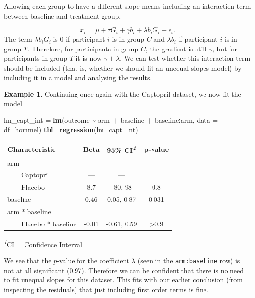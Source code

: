 \documentclass[
  openany]{book}
\newenvironment{Shaded}{\begin{snugshade}}{\end{snugshade}}
\newcommand{\AttributeTok}[1]{\textcolor[rgb]{0.13,0.29,0.53}{#1}}
\newcommand{\FunctionTok}[1]{\textcolor[rgb]{0.13,0.29,0.53}{\textbf{#1}}}
\newcommand{\NormalTok}[1]{#1}
\newcommand{\OtherTok}[1]{\textcolor[rgb]{0.56,0.35,0.01}{#1}}
\newcommand{\SpecialCharTok}[1]{\textcolor[rgb]{0.81,0.36,0.00}{\textbf{#1}}}
\theoremstyle{definition}
\theoremstyle{definition}
\newtheorem{example}{Example}[chapter]
\theoremstyle{definition}
\theoremstyle{definition}
\theoremstyle{remark}
\begin{document}
Allowing each group to have a different slope means including an interaction term between baseline and treatment group,

\[ x_i = \mu + \tau G_i+ \gamma b_i + \lambda b_i G_i + \epsilon_i . \]
The term \(\lambda b_i G_i\) is 0 if participant \(i\) is in group \(C\) and \(\lambda b_i\) if participant \(i\) is in group \(T\). Therefore, for participants in group \(C\), the gradient is still \(\gamma\), but for participants in group \(T\) it is now \(\gamma + \lambda\). We can test whether this interaction term should be included (that is, whether we should fit an unequal slopes model) by including it in a model and analysing the results.

\begin{example}
Continuing once again with the Captopril dataset, we now fit the model

\begin{Shaded}
\begin{Highlighting}[]
\NormalTok{lm\_capt\_int }\OtherTok{=} \FunctionTok{lm}\NormalTok{(outcome }\SpecialCharTok{\textasciitilde{}}\NormalTok{ arm }\SpecialCharTok{+}\NormalTok{ baseline }\SpecialCharTok{+}\NormalTok{ baseline}\SpecialCharTok{:}\NormalTok{arm, }\AttributeTok{data =}\NormalTok{ df\_hommel)}
\FunctionTok{tbl\_regression}\NormalTok{(lm\_capt\_int)}
\end{Highlighting}
\end{Shaded}

\begin{table}[!t]
\fontsize{12.0pt}{14.4pt}\selectfont
\begin{tabular*}{\linewidth}{@{\extracolsep{\fill}}lccc}
\toprule
\textbf{Characteristic} & \textbf{Beta} & \textbf{95\% CI}\textsuperscript{\textit{1}} & \textbf{p-value} \\ 
\midrule\addlinespace[2.5pt]
arm &  &  &  \\ 
    Captopril & — & — &  \\ 
    Placebo & 8.7 & -80, 98 & 0.8 \\ 
baseline & 0.46 & 0.05, 0.87 & 0.031 \\ 
arm * baseline &  &  &  \\ 
    Placebo * baseline & -0.01 & -0.61, 0.59 & >0.9 \\ 
\bottomrule
\end{tabular*}
\begin{minipage}{\linewidth}
\textsuperscript{\textit{1}}CI = Confidence Interval\\
\end{minipage}
\end{table}

We see that the \(p\)-value for the coefficient \(\lambda\) (seen in the \texttt{arm:baseline} row) is not at all significant (0.97). Therefore we can be confident that there is no need to fit unequal slopes for this dataset. This fits with our earlier conclusion (from inspecting the residuals) that just including first order terms is fine.
\end{example}
\end{document}
